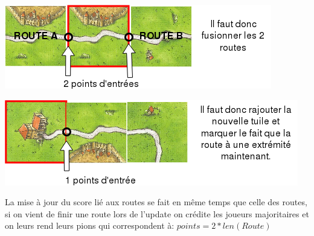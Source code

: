 \includegraphics[scale=1]{routeModif1.png}

\vspace{0.5cm}
\includegraphics[scale=1]{routeModif3.png}
\vspace{0.5cm}

La mise à jour du score lié aux routes se fait en même temps que celle des routes, si on vient de finir une route lors de l'update on crédite les joueurs majoritaires et on leurs rend leurs pions qui  correspondent à: $points = 2 * len(Route)$



